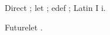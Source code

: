 \documentclass[10pt]{article}
\begin{document}
\let\SavedUpper\ocCyrillicI
\let\SavedLower\occyrillici
\edef\Expanded{\SavedUpper\SavedLower}
\noindent Direct \ocCyrillicI\occyrillici; let \SavedUpper\SavedLower;
edef \Expanded; Latin \space I i.\par
\def\First#1#2{#1}
\noindent Futurelet \futurelet\Future\First\occyrillici\relax\Future.
\end{document}
